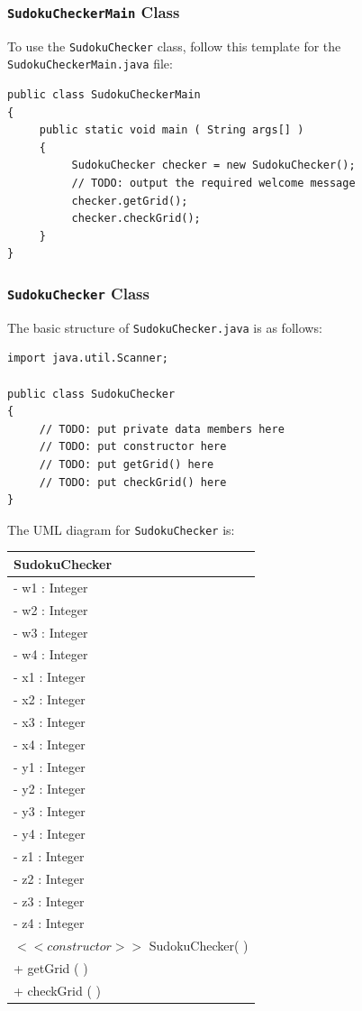 \subsubsection*{{\tt SudokuCheckerMain} Class}

To use the {\tt SudokuChecker} class, follow this template for the {\tt SudokuCheckerMain.java} file:
\begin{verbatim}
public class SudokuCheckerMain
{
     public static void main ( String args[] )
     {
          SudokuChecker checker = new SudokuChecker();
          // TODO: output the required welcome message
          checker.getGrid();
          checker.checkGrid();
     }
}
\end{verbatim}

\subsubsection*{{\tt SudokuChecker} Class}

\noindent The basic structure of {\tt SudokuChecker.java} is as follows:
\begin{verbatim}
import java.util.Scanner;

public class SudokuChecker
{
     // TODO: put private data members here
     // TODO: put constructor here
     // TODO: put getGrid() here
     // TODO: put checkGrid() here
}
\end{verbatim}
The UML diagram for {\tt SudokuChecker} is:
\begin{tabular}{|l|}
\hline
\textbf{SudokuChecker} \\
\hline
- w1 : Integer\\
- w2 : Integer\\
- w3 : Integer\\
- w4 : Integer\\
- x1 : Integer\\
- x2 : Integer\\
- x3 : Integer\\
- x4 : Integer\\
- y1 : Integer\\
- y2 : Integer\\
- y3 : Integer\\
- y4 : Integer\\
- z1 : Integer\\
- z2 : Integer\\
- z3 : Integer\\
- z4 : Integer\\
\hline
$<<constructor>>$ SudokuChecker( )\\
\hline
+ getGrid ( )\\
+ checkGrid ( )\\
\hline
\end{tabular}

